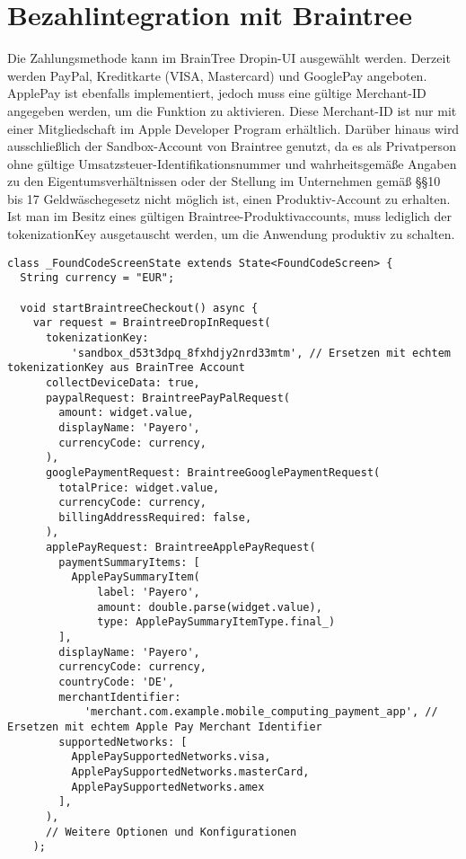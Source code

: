 \section{Bezahlintegration mit Braintree}

Die Zahlungsmethode kann im BrainTree Dropin-UI ausgewählt werden.
Derzeit werden PayPal, Kreditkarte (VISA, Mastercard) und GooglePay angeboten.
ApplePay ist ebenfalls implementiert, jedoch muss eine gültige Merchant-ID angegeben werden, um die Funktion zu aktivieren.
Diese Merchant-ID ist nur mit einer Mitgliedschaft im Apple Developer Program erhältlich.
Darüber hinaus wird ausschließlich der Sandbox-Account von Braintree genutzt, da es als Privatperson ohne gültige Umsatzsteuer-Identifikationsnummer und wahrheitsgemäße Angaben zu den Eigentumsverhältnissen oder der Stellung im Unternehmen gemäß \S\S 10 bis 17 Geldwäschegesetz nicht möglich ist, einen Produktiv-Account zu erhalten.
Ist man im Besitz eines gültigen Braintree-Produktivaccounts, muss lediglich der \glqq tokenizationKey\grqq{} ausgetauscht werden, um die Anwendung produktiv zu schalten.

\begin{lstlisting}[caption={BrainTree Bezahlmethoden}]
  class _FoundCodeScreenState extends State<FoundCodeScreen> {
  String currency = "EUR";

  void startBraintreeCheckout() async {
    var request = BraintreeDropInRequest(
      tokenizationKey:
          'sandbox_d53t3dpq_8fxhdjy2nrd33mtm', // Ersetzen mit echtem tokenizationKey aus BrainTree Account
      collectDeviceData: true,
      paypalRequest: BraintreePayPalRequest(
        amount: widget.value,
        displayName: 'Payero',
        currencyCode: currency,
      ),
      googlePaymentRequest: BraintreeGooglePaymentRequest(
        totalPrice: widget.value,
        currencyCode: currency,
        billingAddressRequired: false,
      ),
      applePayRequest: BraintreeApplePayRequest(
        paymentSummaryItems: [
          ApplePaySummaryItem(
              label: 'Payero',
              amount: double.parse(widget.value),
              type: ApplePaySummaryItemType.final_)
        ],
        displayName: 'Payero',
        currencyCode: currency,
        countryCode: 'DE',
        merchantIdentifier:
            'merchant.com.example.mobile_computing_payment_app', // Ersetzen mit echtem Apple Pay Merchant Identifier
        supportedNetworks: [
          ApplePaySupportedNetworks.visa,
          ApplePaySupportedNetworks.masterCard,
          ApplePaySupportedNetworks.amex
        ],
      ),
      // Weitere Optionen und Konfigurationen
    );  
\end{lstlisting}

